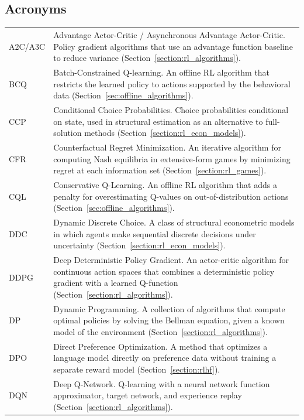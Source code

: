 
\subsection*{Acronyms}

\begin{longtable}{p{2.2cm} p{12cm}}
A2C/A3C & Advantage Actor-Critic / Asynchronous Advantage Actor-Critic. Policy gradient algorithms that use an advantage function baseline to reduce variance (Section~\ref*{section:rl_algorithms}). \\[4pt]
BCQ & Batch-Constrained Q-learning. An offline RL algorithm that restricts the learned policy to actions supported by the behavioral data (Section~\ref*{sec:offline_algorithms}). \\[4pt]
CCP & Conditional Choice Probabilities. Choice probabilities conditional on state, used in structural estimation as an alternative to full-solution methods (Section~\ref*{section:rl_econ_models}). \\[4pt]
CFR & Counterfactual Regret Minimization. An iterative algorithm for computing Nash equilibria in extensive-form games by minimizing regret at each information set (Section~\ref*{section:rl_games}). \\[4pt]
CQL & Conservative Q-Learning. An offline RL algorithm that adds a penalty for overestimating Q-values on out-of-distribution actions (Section~\ref*{sec:offline_algorithms}). \\[4pt]
DDC & Dynamic Discrete Choice. A class of structural econometric models in which agents make sequential discrete decisions under uncertainty (Section~\ref*{section:rl_econ_models}). \\[4pt]
DDPG & Deep Deterministic Policy Gradient. An actor-critic algorithm for continuous action spaces that combines a deterministic policy gradient with a learned Q-function (Section~\ref*{section:rl_algorithms}). \\[4pt]
DP & Dynamic Programming. A collection of algorithms that compute optimal policies by solving the Bellman equation, given a known model of the environment (Section~\ref*{section:rl_algorithms}). \\[4pt]
DPO & Direct Preference Optimization. A method that optimizes a language model directly on preference data without training a separate reward model (Section~\ref*{section:rlhf}). \\[4pt]
DQN & Deep Q-Network. Q-learning with a neural network function approximator, target network, and experience replay (Section~\ref*{section:rl_algorithms}). \\[4pt]

\end{longtable}
